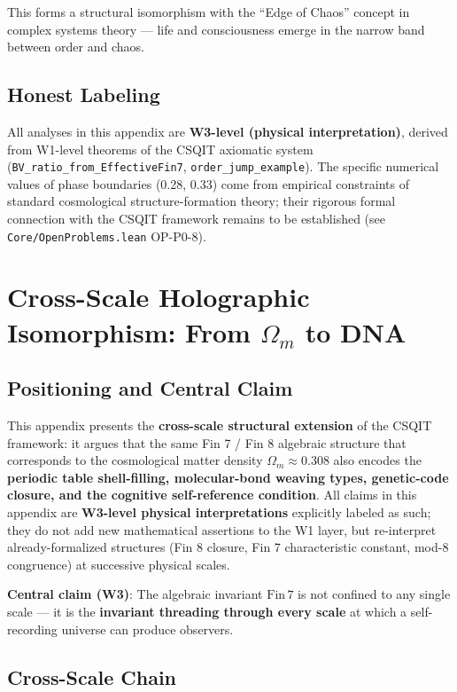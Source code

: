 \documentclass[aps,prd,twocolumn,nofootinbib,floatfix]{revtex4-2}
\begin{document}
This forms a structural isomorphism with the ``Edge of Chaos'' concept in complex systems theory --- life and consciousness emerge in the narrow band between order and chaos.

\subsection{Honest Labeling}

All analyses in this appendix are \textbf{W3-level (physical interpretation)}, derived from W1-level theorems of the CSQIT axiomatic system (\texttt{BV\_ratio\_from\_EffectiveFin7}, \texttt{order\_jump\_example}). The specific numerical values of phase boundaries (0.28, 0.33) come from empirical constraints of standard cosmological structure-formation theory; their rigorous formal connection with the CSQIT framework remains to be established (see \texttt{Core/OpenProblems.lean} OP-P0-8).

\section{Cross-Scale Holographic Isomorphism: From $\Omega_m$ to DNA}

\subsection{Positioning and Central Claim}

This appendix presents the \textbf{cross-scale structural extension} of the CSQIT framework: it argues that the same Fin 7 / Fin 8 algebraic structure that corresponds to the cosmological matter density $\Omega_m \approx 0.308$ also encodes the \textbf{periodic table shell-filling, molecular-bond weaving types, genetic-code closure, and the cognitive self-reference condition}. All claims in this appendix are \textbf{W3-level physical interpretations} explicitly labeled as such; they do not add new mathematical assertions to the W1 layer, but re-interpret already-formalized structures (Fin 8 closure, Fin 7 characteristic constant, mod-8 congruence) at successive physical scales.

\textbf{Central claim (W3)}: The algebraic invariant $\mathrm{Fin}\,7$ is not confined to any single scale --- it is the \textbf{invariant threading through every scale} at which a self-recording universe can produce observers.

\subsection{Cross-Scale Chain}
\end{document}
